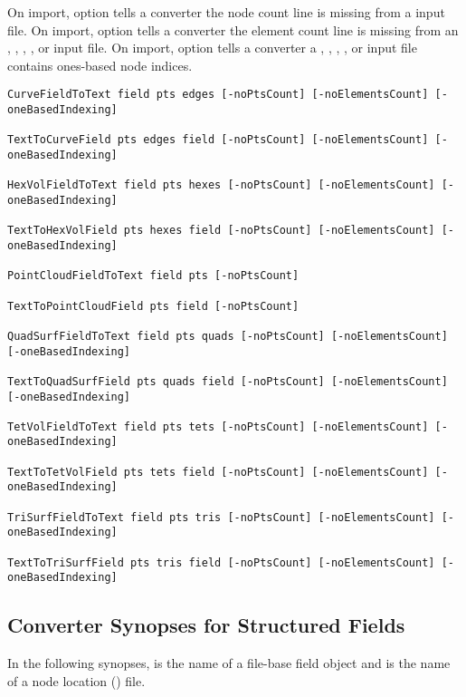 On import, option  tells a converter the node
count line is missing from a  input file.  On import,
option  tells a converter the element count
line is missing from an , ,
, , or  input file.  On
import, option  tells a converter a
, , , , or
 input file contains ones-based node indices.

\begin{verbatim}
CurveFieldToText field pts edges [-noPtsCount] [-noElementsCount] [-oneBasedIndexing]

TextToCurveField pts edges field [-noPtsCount] [-noElementsCount] [-oneBasedIndexing]

HexVolFieldToText field pts hexes [-noPtsCount] [-noElementsCount] [-oneBasedIndexing]

TextToHexVolField pts hexes field [-noPtsCount] [-noElementsCount] [-oneBasedIndexing]

PointCloudFieldToText field pts [-noPtsCount]

TextToPointCloudField pts field [-noPtsCount]

QuadSurfFieldToText field pts quads [-noPtsCount] [-noElementsCount] [-oneBasedIndexing]

TextToQuadSurfField pts quads field [-noPtsCount] [-noElementsCount] [-oneBasedIndexing]

TetVolFieldToText field pts tets [-noPtsCount] [-noElementsCount] [-oneBasedIndexing]

TextToTetVolField pts tets field [-noPtsCount] [-noElementsCount] [-oneBasedIndexing]

TriSurfFieldToText field pts tris [-noPtsCount] [-noElementsCount] [-oneBasedIndexing]

TextToTriSurfField pts tris field [-noPtsCount] [-noElementsCount] [-oneBasedIndexing]
\end{verbatim}


\subsection{Converter Synopses for Structured Fields}
\label{sec:struct_field_synopses}

In the following synopses,  is the name of a \sr{}
file-base field object and  is the name of a node location
() file.

